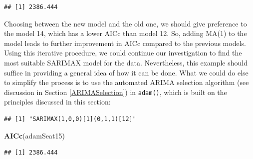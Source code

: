 \documentclass[]{book}
\newenvironment{Shaded}{\begin{snugshade}}{\end{snugshade}}
\newcommand{\DataTypeTok}[1]{\textcolor[rgb]{0.13,0.29,0.53}{#1}}
\newcommand{\DecValTok}[1]{\textcolor[rgb]{0.00,0.00,0.81}{#1}}
\newcommand{\KeywordTok}[1]{\textcolor[rgb]{0.13,0.29,0.53}{\textbf{#1}}}
\newcommand{\NormalTok}[1]{#1}
\newcommand{\OperatorTok}[1]{\textcolor[rgb]{0.81,0.36,0.00}{\textbf{#1}}}
\newcommand{\OtherTok}[1]{\textcolor[rgb]{0.56,0.35,0.01}{#1}}
\newcommand{\StringTok}[1]{\textcolor[rgb]{0.31,0.60,0.02}{#1}}
\theoremstyle{definition}
\theoremstyle{definition}
\theoremstyle{definition}
\theoremstyle{definition}
\theoremstyle{remark}
\begin{document}
\begin{verbatim}
## [1] 2386.444
\end{verbatim}

Choosing between the new model and the old one, we should give preference to the model 14, which has a lower AICc than model 12. So, adding MA(1) to the model leads to further improvement in AICc compared to the previous models. Using this iterative procedure, we could continue our investigation to find the most suitable SARIMAX model for the data. Nevertheless, this example should suffice in providing a general idea of how it can be done. What we could do else to simplify the process is to use the automated ARIMA selection algorithm (see discussion in Section \ref{ARIMASelection}) in \texttt{adam()}, which is built on the principles discussed in this section:

\begin{Shaded}
\end{Shaded}

\begin{verbatim}
## [1] "SARIMAX(1,0,0)[1](0,1,1)[12]"
\end{verbatim}

\begin{Shaded}
\begin{Highlighting}[]
\KeywordTok{AICc}\NormalTok{(adamSeat15)}
\end{Highlighting}
\end{Shaded}

\begin{verbatim}
## [1] 2386.444
\end{verbatim}
\end{document}
